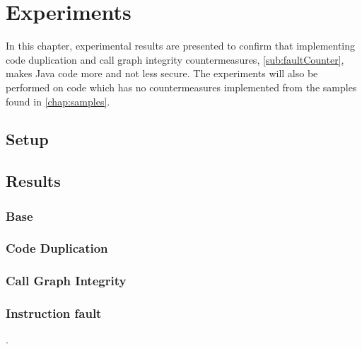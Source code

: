 \chapter{Experiments}
In this chapter, experimental results are presented to confirm that implementing code duplication and call graph integrity countermeasures, \cref{sub:faultCounter}, makes Java code more and not less secure. The experiments will also be performed on code which has no countermeasures implemented from the \jc samples found in \cref{chap:samples}.
%
\section{Setup}

\section{Results}

\subsection{Base}

\subsection{Code Duplication}

\subsection{Call Graph Integrity}

\subsection{Instruction fault}
.
